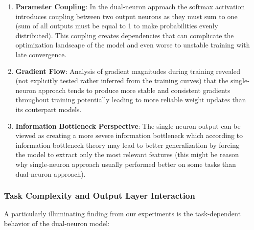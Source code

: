 \begin{enumerate}
\item \textbf{Parameter Coupling}: In the dual-neuron approach the softmax activation introduces coupling between two output neurons as they must sum to one (sum of all outputs must be equal to 1 to make probabilities evenly distributed). This coupling creates dependencies that can complicate the optimization landscape of the model and even worse to unstable training with late convergence.

\item \textbf{Gradient Flow}: Analysis of gradient magnitudes during training revealed (not explicitly tested rather inferred from the training curves) that the single-neuron approach tends to produce more stable and consistent gradients throughout training potentially leading to more reliable weight updates than its couterpart models.

\item \textbf{Information Bottleneck Perspective}: The single-neuron output can be viewed as creating a more severe information bottleneck which according to information bottleneck theory may lead to better generalization by forcing the model to extract only the most relevant features (this might be reason why single-neuron approach usually performed better on some tasks than dual-neuron approach).
\end{enumerate}

\subsubsection{Task Complexity and Output Layer Interaction}

A particularly illuminating finding from our experiments is the task-dependent behavior of the dual-neuron model:

